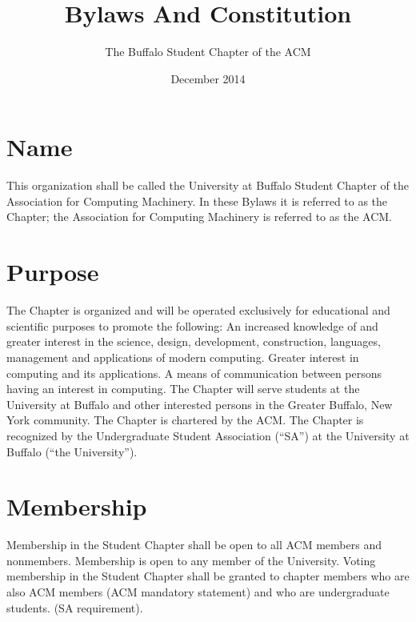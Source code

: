 \documentclass{article}
\title{Bylaws And Constitution}
\author{The Buffalo Student Chapter of the ACM}
\date{December 2014}
\begin{document}
\maketitle

\section{Name}

This organization shall be called the University at Buffalo Student Chapter of the Association for Computing Machinery. In these Bylaws it is referred to as the Chapter; the Association for Computing Machinery is referred to as the ACM.

\section{Purpose}

The Chapter is organized and will be operated exclusively for educational and scientific purposes to promote the following:
An increased knowledge of and greater interest in the science, design, development, construction, languages, management and applications of modern computing.
Greater interest in computing and its applications.
A means of communication between persons having an interest in computing.
The Chapter will serve students at the University at Buffalo and other interested persons in the Greater Buffalo, New York community.
The Chapter is chartered by the ACM.
The Chapter is recognized by the Undergraduate Student Association (“SA”) at the University at Buffalo (“the University”).

\section{Membership}
Membership in the Student Chapter shall be open to all ACM members and nonmembers.
Membership is open to any member of the University.
Voting membership in the Student Chapter shall be granted to chapter members who are also ACM members (ACM mandatory statement) and who are undergraduate students. (SA requirement).
\end{document}
